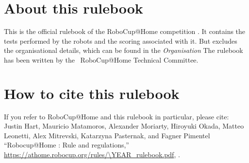 


\section*{About this rulebook}
This is the official rulebook of the RoboCup@Home competition \YEAR. It contains the tests performed by the robots and the scoring associated with it. But excludes the organisational details, which can be found in the \emph{Organisation}
The rulebook has been written by the \YEAR ~RoboCup@Home Technical Committee.



\section*{How to cite this rulebook}
If you refer to RoboCup@Home and this rulebook in particular, please cite:\\

\noindent Justin Hart, Mauricio Matamoros, Alexander Moriarty, Hiroyuki Okada,
Matteo Leonetti, Alex Mitrevski, Katarzyna Pasternak, and Fagner Pimentel
\enquote{Robocup@Home \YEAR: Rule and regulations,}
\url{https://athome.robocup.org/rules/\YEAR_rulebook.pdf}, \YEAR.

\begin{center}
	\begin{minipage}{0.8\textwidth}
		\footnotesize%
		
	\end{minipage}
\end{center}

